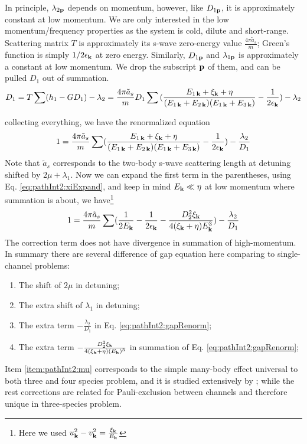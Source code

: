 In principle, $\lambda_{2\mathbf{p}}$ depends on momentum, however, like $D_{1\mathbf{p}}$, it is approximately constant at low momentum.
We are only interested in the low momentum/frequency properties as the system is cold, dilute and short-range. Scattering matrix $T$ is approximately its s-wave zero-energy value $\frac{4\pi{\tilde{a}_{s}}}{m}$; Green's function is simply $1/2\epsilon_{\mathbf{k}}$ at zero energy.   Similarly,   $D_{1\mathbf{p}}$ and $\lambda_{1\mathbf{p}}$ is approximately a constant at low momentum.  We drop the subscript $\mathbf{p}$ of them, and can be pulled $D_{1}$ out of summation. 
\begin{equation}
D_{1}=T\sum(h_{1}-GD_{1})-\lambda_{2}
=\frac{4\pi{\tilde{a}_{s}}}{m}D_{1}\sum{}(\frac{E_{1\,\mathbf{k}}+\xi_{\mathbf{k}}+\eta}{(E_{1\,\mathbf{k}}+E_{2\,\mathbf{k}})(E_{1\,\mathbf{k}}+E_{3\,\mathbf{k}})}-\frac{1}{2\epsilon_{\mathbf{k}}})
	-\lambda_{2}
\end{equation}

collecting everything, we have the renormalized equation
\begin{equation}
1=\frac{4\pi{\tilde{a}_{s}}}{m}\sum(\frac{E_{1\,\mathbf{k}}+\xi_{\mathbf{k}}+\eta}{(E_{1\,\mathbf{k}}+E_{2\,\mathbf{k}})(E_{1\,\mathbf{k}}+E_{3\,\mathbf{k}})}-\frac{1}{2\epsilon_{\mathbf{k}}})
	-\frac{\lambda_{2}}{D_{1}}
\end{equation}
Note that $\tilde{a}_{s}$ corresponds to the two-body s-wave scattering length at detuning shifted by $2\mu+\lambda_{1}$.
Now we can expand the first term in the parentheses, using Eq. \ref{eq:pathInt2:xiExpand}, and keep in mind $E_{\mathbf{k}}\ll{\eta}$ at low momentum where summation is about, we have\footnote{Here we used $u_{\mathbf{k}}^{2}-v_{\mathbf{k}}^{2}=\frac{\xi_{\mathbf{k}}}{E_{\mathbf{k}}}$}
\begin{equation}\label{eq:pathInt2:gapRenorm}
1=\frac{4\pi{\tilde{a}_{s}}}{m}\sum(\frac{1}{2E_{\mathbf{k}}}-\frac{1}{2\epsilon_{\mathbf{k}}}-\frac{D_{2}^{2}\xi_{\mathbf{k}}}{4(\xi_{\mathbf{k}}+\eta){E_{\mathbf{k}}^{3}}})
	-\frac{\lambda_{2}}{D_{1}}
\end{equation}
The correction term does not have divergence in summation of high-momentum. 
In summary there are several difference of gap equation here comparing to single-channel problems:
\begin{enumerate}
\item\label{item:pathInt2:mu}The shift of $2\mu$ in detuning;
\item The extra shift of $\lambda_{1}$ in detuning;
\item The extra term $-\frac{\lambda_{2}}{D_{1}}$ in Eq. \ref{eq:pathInt2:gapRenorm};
\item The extra term $-\frac{D_{2}^{2}\xi_{\mathbf{k}}}{4(\xi_{\mathbf{k}}+\eta){(E_{\mathbf{k}})^{3}}}$ in summation of Eq. \ref{eq:pathInt2:gapRenorm};
\end{enumerate}
Item \ref{item:pathInt2:mu} corresponds to the simple many-body effect  universal to both three and four species problem, and it is studied extensively by \cite{GurarieNarrow}; while the rest corrections are related for Pauli-exclusion between channels and therefore unique in three-species problem.

